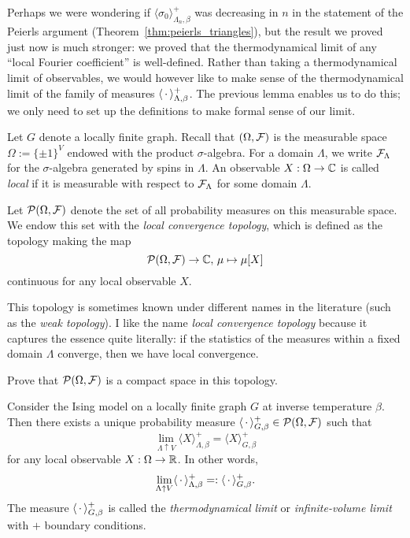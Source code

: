 Perhaps we were wondering if $\langle\sigma_0\rangle_{\Lambda_n,\beta}^+$
was decreasing in $n$ in the statement of the Peierls argument
(Theorem~\ref{thm:peierls_triangles}),
but the result we proved just now is much stronger:
we proved that the thermodynamical limit of any ``local Fourier coefficient''
is well-defined.
Rather than taking a thermodynamical limit of observables,
we would however like to make sense of the thermodynamical limit
of the family of measures $\langle\,\cdot\,\rangle_{\Lambda,\beta}^+$.
The previous lemma enables us to do this;
we only need to set up the definitions to make formal sense of our limit.

\begin{definition}
    Let $G$ denote a locally finite graph.
    Recall that $(\Omega,\mathcal F)$ is the measurable space $\Omega:=\{\pm1\}^V$
    endowed with the product $\sigma$-algebra.
    For a domain $\Lambda$, we write $\mathcal F_\Lambda$
    for the $\sigma$-algebra generated by spins in $\Lambda$.
    An observable $X:\Omega\to\mathbb C$ is called \emph{local} if it is measurable
    with respect to $\mathcal F_\Lambda$ for some domain $\Lambda$.

    Let $\mathcal P(\Omega,\mathcal F)$ denote the set of all probability measures
    on this measurable space.
    We endow this set with the \emph{local convergence topology},
    which is defined as the topology making the map
    \[
        \mathcal P(\Omega,\mathcal F)\to\mathbb C,\,\mu\mapsto\mu[X]
    \]
    continuous for any local observable $X$.
\end{definition}

\begin{remark}
    This topology is sometimes known under different names in the literature
    (such as the \emph{weak topology}).
    I like the name \emph{local convergence topology} because it captures the essence quite literally:
    if the statistics of the measures within a fixed domain $\Lambda$ converge,
    then we have local convergence.
\end{remark}

\begin{exercise}
    Prove that $\mathcal P(\Omega,\mathcal F)$ is a compact space in this topology.
\end{exercise}

\begin{theorem}
    Consider the Ising model on a locally finite graph $G$
    at inverse temperature $\beta$.
    Then there exists a unique probability measure
    $\langle\,\cdot\,\rangle_{G,\beta}^+\in\mathcal P(\Omega,\mathcal F)$
    such that
    \[
        \lim_{\Lambda\uparrow V}\langle X\rangle_{\Lambda,\beta}^+=\langle X\rangle_{G,\beta}^+
    \]
    for any local observable $X:\Omega\to\mathbb R$.
    In other words,
    \[
        \lim_{\Lambda\uparrow V}\langle \,\cdot\,\rangle_{\Lambda,\beta}^+
        =:
        \langle \,\cdot\,\rangle_{G,\beta}^+.
    \]
    The measure $\langle\,\cdot\,\rangle_{G,\beta}^+$ is called
    the \emph{thermodynamical limit} or \emph{infinite-volume limit}
    with $+$ boundary conditions.
\end{theorem}

